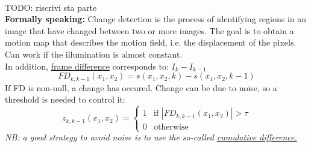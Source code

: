 \\TODO: riscrivi sta parte
\\
\textbf{Formally speaking:}
Change detection is the process of identifying regions in an image that have changed between two or more images. The goal is to obtain a motion map that describes the motion field, i.e. the displacement of the pixels. Can work if the illumination is almost constant.
\\In addition, \underline{frame difference} corresponds to: $I_k - I_{k-1}$
\[
    FD_{k, k-1}(x_1, x_2)= s(x_1, x_2, k)-s(x_1, x_2, k-1)
\]
If FD is non-null, a change has occured. Change can be due to noise, so a threshold is needed to control it:
\[
    z_{k, k-1}(x_1, x_2)= \begin{cases} 1 & \text{if } |FD_{k, k-1}(x_1, x_2)| > \tau \\ 0 & \text{otherwise} \end{cases}
\]
\textit{NB: a good strategy to avoid noise is to use the so-called \underline{cumulative difference.}}
